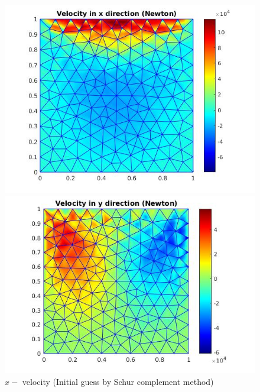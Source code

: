 \documentclass[a4paper]{book}
\begin{document}
\begin{figure}
  \begin{minipage}[c]{0.67\textwidth}
    \includegraphics[width=\textwidth]{lid_newton_vx_schur.jpg}
  \end{minipage}\hfill
  \begin{minipage}[c]{0.3\textwidth}
    \caption{$x-$ velocity (Initial guess by Schur complement method)}
  \label{x_vel_navier_stoke_schur_lid}
  \end{minipage}
  \begin{minipage}[c]{0.67\textwidth}
    \includegraphics[width=\textwidth]{lid_newton_vy_schur.jpg}
  \end{minipage}\hfill
  \begin{minipage}[c]{0.3\textwidth}

\end{minipage}
\end{figure}
\end{document}

